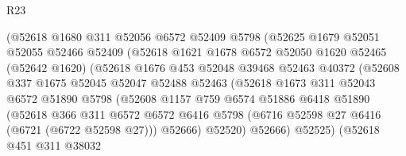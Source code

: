 \begin{lexlean}{R23}
\begin{coremodule}
                        (@52618
                          @1680
                          @311
                          @52056
                          @6572
                          @52409
                          @5798
                          (@52625
                            @1679
                            @52051
                            @52055
                            @52466
                            @52409
                            (@52618
                              @1621
                              @1678
                              @6572
                              @52050
                              @1620
                              @52465
                              (@52642 @1620)
                              (@52618
                                @1676
                                @453
                                @52048
                                @39468
                                @52463
                                @40372
                                (@52608
                                  @337
                                  @1675
                                  @52045
                                  @52047
                                  @52488
                                  @52463
                                  (@52618
                                    @1673
                                    @311
                                    @52043
                                    @6572
                                    @51890
                                    @5798
                                    (@52608
                                      @1157
                                      @759
                                      @6574
                                      @51886
                                      @6418
                                      @51890
                                      (@52618
                                        @366
                                        @311
                                        @6572
                                        @6572
                                        @6416
                                        @5798
                                        (@6716 @52598 @27 @6416 (@6721 (@6722 @52598 @27)))
                                        @52666)
                                      @52520)
                                    @52666)
                                  @52525)
                                (@52618
                                  @451
                                  @311
                                  @38032

\end{coremodule}
\end{lexlean}
